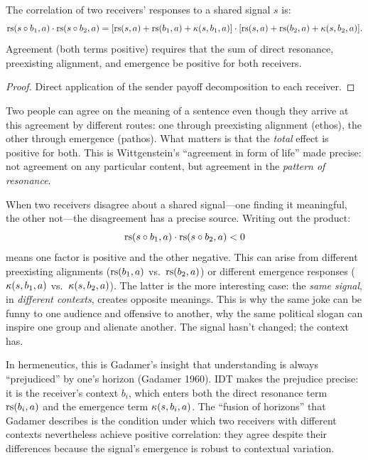 \begin{theorem}
\label{thm:agreement-decomp}
The correlation of two receivers' responses to a shared signal $s$ is:
\[
\mathrm{rs}(s \circ b_1, a) \cdot \mathrm{rs}(s \circ b_2, a) =
[\mathrm{rs}(s, a) + \mathrm{rs}(b_1, a) + \kappa(s, b_1, a)] \cdot
[\mathrm{rs}(s, a) + \mathrm{rs}(b_2, a) + \kappa(s, b_2, a)].
\]
Agreement (both terms positive) requires that the sum of direct resonance,
preexisting alignment, and emergence be positive for both receivers.
\end{theorem}

\begin{proof}
Direct application of the sender payoff decomposition to each receiver.
\end{proof}

\begin{interpretation}
Two people can agree on the meaning of a sentence even though they arrive
at this agreement by different routes: one through preexisting alignment
(ethos), the other through emergence (pathos). What matters is that the
\emph{total} effect is positive for both. This is Wittgenstein's ``agreement
in form of life'' made precise: not agreement on any particular content, but
agreement in the \emph{pattern of resonance}.
\end{interpretation}

\begin{remark}
When two receivers disagree about a shared signal---one finding it meaningful,
the other not---the disagreement has a precise source. Writing out the product:
\[
\mathrm{rs}(s \circ b_1, a) \cdot \mathrm{rs}(s \circ b_2, a) < 0
\]
means one factor is positive and the other negative. This can arise from
different preexisting alignments ($\mathrm{rs}(b_1, a)$ vs.\ $\mathrm{rs}(b_2, a)$) or
different emergence responses ($\kappa(s, b_1, a)$ vs.\ $\kappa(s, b_2, a)$).
The latter is the more interesting case: the \emph{same signal}, in
\emph{different contexts}, creates opposite meanings. This is why the same
joke can be funny to one audience and offensive to another, why the same
political slogan can inspire one group and alienate another. The
signal hasn't changed; the context has.

In hermeneutics, this is Gadamer's insight that understanding is always
``prejudiced'' by one's horizon (Gadamer 1960). IDT makes the prejudice
precise: it is the receiver's context $b_i$, which enters both the
direct resonance term $\mathrm{rs}(b_i, a)$ and the emergence term
$\kappa(s, b_i, a)$. The ``fusion of horizons'' that Gadamer describes
is the condition under which two receivers with different contexts
nevertheless achieve positive correlation: they agree despite their
differences because the signal's emergence is robust to contextual
variation.
\end{remark}


